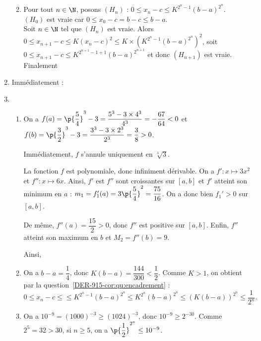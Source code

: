 \begin{enumerate}
\begin{enumerate}
\begin{center}
\end{center}
\item\label{DER-915-cor:qu:encadrement} Pour tout $n\in\N$, posons $(H_n)$ : $0\leq x_n-c\leq K^{2^n-1}(b-a)^{2^n}$.\\
$(H_0)$ est vraie car $0\leq x_0-c=b-c\leq b-a$.\\
Soit $n\in\N$ tel que $(H_n)$ est vraie. Alors $0\leq x_{n+1}-c\leq K(x_n-c)^2
\leq K\times (K^{2^n-1}(b-a)^{2^n})^2$, soit $0\leq x_{n+1}-c\leq K^{2^{n+1}-1+1}(b-a)^{2^{n+1}}$ et donc $(H_{n+1})$ est vraie. Finalement
\begin{center}
\end{center}
\end{enumerate}
\item Immédiatement :  
\item 
    \begin{enumerate}
        \item On a $f(a) = \p{\dfrac{5}{4}}^3-3 = \dfrac{5^3-3\times 4^3}{4^3} = -\dfrac{67}{64}<0$ et $f(b) = \p{\dfrac{3}{2}}^3-3 = \dfrac{3^3-3\times 2^3}{2^3} = \dfrac{3}{8}>0$.
        
            Immédiatement, $f$ s'annule uniquement en $\sqrt[3]{3}$.
            
            La fonction $f$ est polynomiale, donc infiniment dérivable. On a $f' : x \mapsto 3x^2$ et $f'' : x\mapsto 6x$. Ainsi, $f'$ est $f''$ sont croissantes sur $[a,b]$ et $f'$ atteint son minimum en $a$ : $m_1 = f_1'(a) = 3\p{\dfrac{5}{4}}^2 = \dfrac{75}{16}$. On a donc bien $f_1'>0$ sur $[a,b]$. 
            
            De même, $f''(a) = \dfrac{15}{2}>0$, donc $f''$ est positive sur $[a,b]$. Enfin, $f''$ atteint son maximum en $b$ et $M_2 = f''(b) =  9$.
            
            Ainsi, 
        \item On a $b-a = \dfrac{1}{4}$, donc $K(b-a) = \dfrac{144}{300} < \dfrac{1}{2}$. Comme $K>1$, on obtient par la question~\ref{DER-915-cor:qu:encadrement} : 
            \begin{equation*}
                \boxed{0 \leq x_n-c \leq \leq K^{2^n-1}(b-a)^{2^n} \leq K^{2^n}(b-a)^{2^n} \leq (K(b-a))^{2^n} \leq \dfrac{1}{2^n}.}
            \end{equation*}
        \item On a $10^{-9} = (1000)^{-3} \geq (1024)^{-3}$, donc $10^{-9} \geq 2^{-30}$. Comme $2^{5} = 32 > 30$, si $n\geq 5$, on a $\p{\dfrac{1}{2}}^{2^n} \leq 10^{-9}$. 
        

\end{enumerate}
\end{enumerate}
